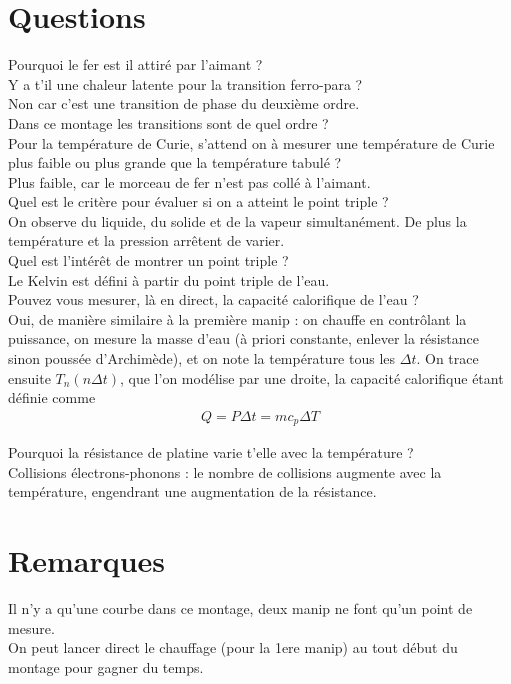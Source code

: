 \documentclass[12pt,prb,aps,epsf]{article}
\begin{document}
\section*{Questions}
Pourquoi le fer est il attiré par l'aimant ?\\

Y a t'il une chaleur latente pour la transition ferro-para ?\\
Non car c'est une transition de phase du deuxième ordre.\\

Dans ce montage les transitions sont de quel ordre ?\\

Pour la température de Curie, s'attend on à mesurer une température de Curie plus faible ou plus grande que la température tabulé ?\\
Plus faible, car le morceau de fer n'est pas collé à l'aimant.\\

Quel est le critère pour évaluer si on a atteint le point triple ?\\
On observe du liquide, du solide et de la vapeur simultanément. De plus la température et la pression arrêtent de varier.\\

Quel est l'intérêt de montrer un point triple ? \\
Le Kelvin est défini à partir du point triple de l'eau.\\

Pouvez vous mesurer, là en direct, la capacité calorifique de l'eau ?\\
Oui, de manière similaire à la première manip : on chauffe en contrôlant la puissance, on mesure la masse d'eau (à priori constante, enlever la résistance sinon poussée d'Archimède), et on note la température tous les $\Delta t$. On trace ensuite $T_n(n\Delta t)$, que l'on modélise par une droite, la capacité calorifique étant définie comme 
\begin{eqnarray}
Q = P\Delta t = mc_p\Delta T
\end{eqnarray}

Pourquoi la résistance de platine varie t'elle avec la température ?\\
Collisions électrons-phonons : le nombre de collisions augmente avec la température, engendrant une augmentation de la résistance.

\section*{Remarques}
Il n'y a qu'une courbe dans ce montage, deux manip ne font qu'un point de mesure.\\
On peut lancer direct le chauffage (pour la 1ere manip) au tout début du montage pour gagner du temps.\\
\end{document}
